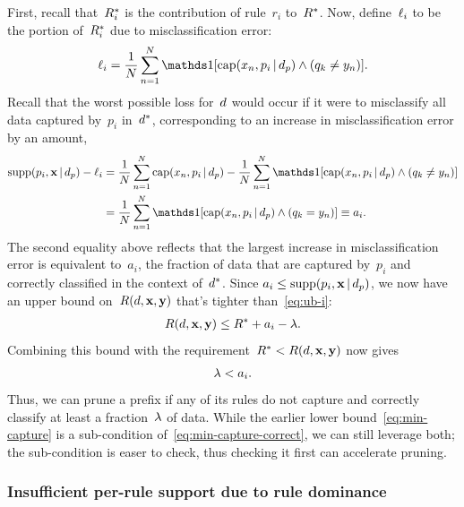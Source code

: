 First, recall that~$R^*_i$ is the contribution of rule~$r_i$ to~$R^*$.
%
Now, define~$\ell_i$ to be the portion of~$R^*_i$ due to misclassification error:
\begin{align}
\Loss_i = \frac{1}{N} \sum_{n=1}^N
  \one [ \Cap(x_n, p_i \given \Prefix) \wedge (q_k \neq y_n) ].
\end{align}
Recall that the worst possible loss for~${d}$ would occur if it were to
misclassify all data captured by~$p_i$ in~$d^*$,
corresponding to an increase in misclassification error by an amount,
\begin{align}
\Supp(p_i, \x \given \Prefix) - \Loss_i
&= \frac{1}{N} \sum_{n=1}^N \Cap(x_n, p_i \given \Prefix)
  - \frac{1}{N} \sum_{n=1}^N
  \one [ \Cap(x_n, p_i \given \Prefix) \wedge (q_k \neq y_n) ] \nn \\
&= \frac{1}{N} \sum_{n=1}^N
  \one [ \Cap(x_n, p_i \given \Prefix) \wedge (q_k = y_n) ] \equiv a_i.
\end{align}
The second equality above reflects that the largest increase in
misclassification error is equivalent to~$a_i$, the fraction of data that
are captured by~$p_i$ and correctly classified in the context of~$d^*$.
%
Since ${a_i \le \textnormal{supp}(p_i, \mathbf{x} \,|\, d_p)}$, we now have
an upper bound on~$R({d}, \mathbf{x}, \mathbf{y})$ that's tighter than~\eqref{eq:ub-i}:
\begin{align}
\Obj(\RL, \x, \y) \le \OptimalObj + a_i - \Reg.
\end{align}
Combining this bound with the requirement~${R^* < R({d}, \mathbf{x}, \mathbf{y})}$ now gives
\begin{align}
\Reg < a_i.
\label{eq:min-capture-correct}
\end{align}
Thus, we can prune a prefix if any of its rules do not capture
and correctly classify at least a fraction~${\lambda}$ of data.
%
While the earlier lower bound~\eqref{eq:min-capture} is a sub-condition
of~\eqref{eq:min-capture-correct}, we can still leverage both;
the sub-condition is easer to check, thus checking it first can accelerate pruning.

\subsubsection{Insufficient per-rule support due to rule dominance}

